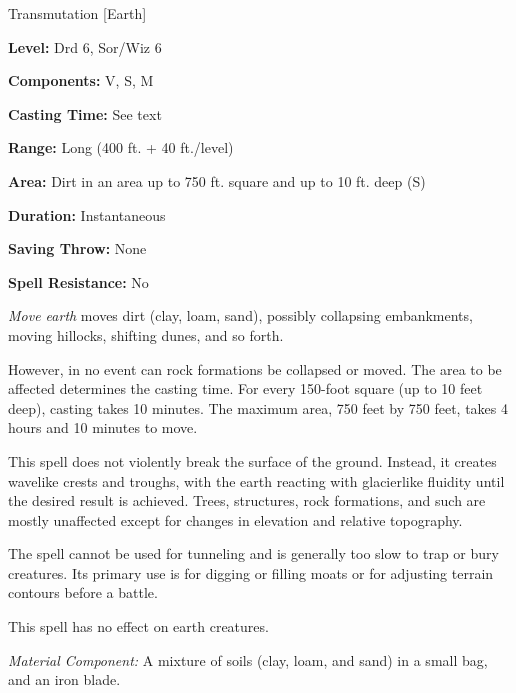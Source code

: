 
Transmutation [Earth]

\textbf{Level:} Drd 6, Sor/Wiz 6

\textbf{Components:} V, S, M

\textbf{Casting Time:} See text

\textbf{Range:} Long (400 ft. + 40 ft./level)

\textbf{Area:} Dirt in an area up to 750 ft. square and up to 10 ft. deep (S)

\textbf{Duration:} Instantaneous

\textbf{Saving Throw:} None

\textbf{Spell Resistance:} No

\textit{Move earth} moves dirt (clay, loam, sand), possibly collapsing embankments, 
moving hillocks, shifting dunes, and so forth.

However, in no event can rock formations be collapsed or moved. The area to be 
affected determines the casting time. For every 150-foot square (up to 10 feet 
deep), casting takes 10 minutes. The maximum area, 750 feet by 750 feet, takes 
4 hours and 10 minutes to move.

This spell does not violently break the surface of the ground. Instead, it creates 
wavelike crests and troughs, with the earth reacting with glacierlike fluidity 
until the desired result is achieved. Trees, structures, rock formations, and such 
are mostly unaffected except for changes in elevation and relative topography.

The spell cannot be used for tunneling and is generally too slow to trap or bury 
creatures. Its primary use is for digging or filling moats or for adjusting terrain 
contours before a battle.

This spell has no effect on earth creatures.

\textit{Material Component:} A mixture of soils (clay, loam, and sand) in a small 
bag, and an iron blade.

